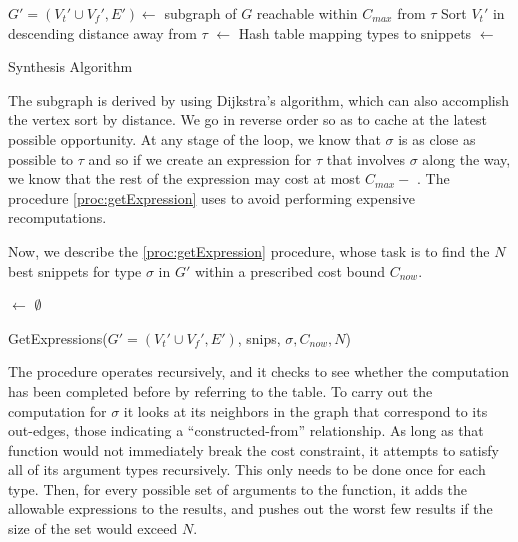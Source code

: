 \begin{algorithm}
\BlankLine
$G'=(V_t'\cup V_f', E') \longleftarrow$ subgraph of $G$ reachable within $C_{max}$ from $\tau$ \;
Sort $V_t'$ in descending distance away from $\tau$ \;
\Snips $\longleftarrow$ Hash table mapping types to snippets \;
\Exprs $\longleftarrow$ \Snips[$\tau$] \;
\caption{Synthesis Algorithm}\label{proc:synthesize}
\end{algorithm}

The subgraph is derived by using Dijkstra's algorithm, which can also accomplish the vertex sort by distance. We go in reverse order so as to cache at the latest possible opportunity. At any stage of the loop, we know that $\sigma$ is as close as possible to $\tau$ and so if we create an expression for $\tau$ that involves $\sigma$ along the way, we know that the rest of the expression may cost at most $C_{max} - $ \Dist{$\sigma$}. The procedure \ref{proc:getExpression} uses \Snips to avoid performing expensive recomputations.

Now, we describe the \ref{proc:getExpression} procedure, whose task is to find the $N$ best snippets for type $\sigma$ in $G'$ within a prescribed cost bound $C_{now}$.
\begin{procedure}
\lIf{$\sigma$ $\in$ \Keys{\Snips}}{\Return{\Snips$[\sigma]$}}
\Results $\leftarrow$ $\emptyset$ \;
\Return{\Results}
\caption{GetExpressions({$G'=(V_t' \cup V_f', E')$}, snips, $\sigma, C_{now}, N$)}\label{proc:getExpression}
\end{procedure}
The procedure operates recursively, and it checks to see whether the computation has been completed before by referring to the \Snips table. To carry out the computation for $\sigma$ it looks at its neighbors in the graph that correspond to its out-edges, those indicating a ``constructed-from'' relationship. As long as that function would not immediately break the cost constraint, it attempts to satisfy all of its argument types recursively. This only needs to be done once for each type. Then, for every possible set of arguments to the function, it adds the allowable expressions to the results, and pushes out the worst few results if the size of the set would exceed $N$.

